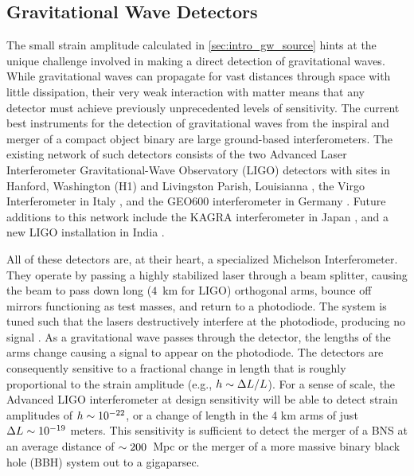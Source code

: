 \subsection{Gravitational Wave Detectors}
\label{sec:intro_gw_det}
The small strain amplitude calculated in \cref{sec:intro_gw_source} hints at the unique challenge involved in making a direct detection of gravitational waves. While gravitational waves can propagate for vast distances through space with little dissipation, their very weak interaction with matter means that any detector must achieve previously unprecedented levels of sensitivity. The current best instruments for the detection of gravitational waves from the inspiral and merger of a compact object binary are large ground-based interferometers. The existing network of such detectors consists of the two Advanced Laser Interferometer Gravitational-Wave Observatory (LIGO) detectors with sites in Hanford, Washington (H1) and Livingston Parish, Louisianna \citep[L1;][]{LIGOEarlyRef,LIGOMainRef}, the Virgo Interferometer in Italy \citep{VirgoC7Burst,VIRGORef}, and the GEO600 interferometer in Germany \citep{GEOMainRef}. Future additions to this network include the KAGRA interferometer in Japan \citep{KAGRA}, and a new LIGO installation in India \citep[LIGO-India;][]{LIGOIndia}.

All of these detectors are, at their heart, a specialized Michelson Interferometer. They operate by passing a highly stabilized laser through a beam splitter, causing the beam to pass down long ($4$~km for LIGO) orthogonal arms, bounce off mirrors functioning as test masses, and return to a photodiode. The system is tuned such that the lasers destructively interfere at the photodiode, producing no signal \citep[see e.g.,][and references therein]{LIGOMainRef,Adhikari2014}. As a gravitational wave passes through the detector, the lengths of the arms change causing a signal to appear on the photodiode. The detectors are consequently sensitive to a fractional change in length that is roughly proportional to the strain amplitude (e.g., $h \sim \Delta L / L$). For a sense of scale, the Advanced LIGO interferometer at design sensitivity will be able to detect strain amplitudes of $h \sim 10^{-22}$, or a change of length in the 4 km arms of just $\Delta L \sim 10^{-19}$ meters. This sensitivity is sufficient to detect the merger of a BNS at an average distance of $\sim 200$~Mpc or the merger of a more massive binary black hole (BBH) system out to a gigaparsec.

